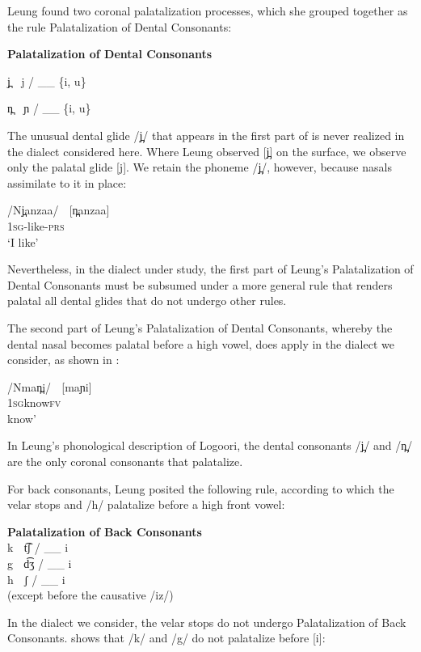 \documentclass[output=paper]{langsci/langscibook}
\begin{document}
Leung found two coronal palatalization processes, which she grouped together as the rule Palatalization of Dental Consonants:


\ea{}

\textbf{Palatalization of Dental Consonants} \citep[117]{Leung1991}




j̪  j / \_\_ \{i, u\}

n̪  ɲ / \_\_ \{i, u\}
\z


The unusual dental glide /j̪/ that appears in the first part of  is never realized in the dialect considered here. Where Leung observed [j̪] on the surface, we observe only the palatal glide [j]. We retain the phoneme /j̪/, however, because nasals assimilate to it in place:

\ea{}
 /Nj̪anzaa/    [n̪anzaa]  \\{}
\textsc{1sg}{}-like-\textsc{prs}\\{}
\glt ‘I like’
\z

Nevertheless, in the dialect under study, the first part of Leung’s Palatalization of Dental Consonants must be subsumed under a more general rule that renders palatal all dental glides that do not undergo other rules.

The second part of Leung’s Palatalization of Dental Consonants, whereby the dental nasal becomes palatal before a high vowel, does apply in the dialect we consider, as shown in :


\ea{}
 /Nman̪i/    [maɲi]   \\{} 
\textsc{1sg}know\textsc{fv}\\{}
 know’
\z

In Leung’s phonological description of Logoori, the dental consonants /j̪/ and /n̪/ are the only coronal consonants that palatalize.    

For back consonants, Leung posited the following rule, according to which the velar stops and /h/ palatalize before a high front vowel:


\ea{}
\textbf{Palatalization of Back Consonants} \citep[116]{Leung1991}\\{}
k  t͡ʃ / \_\_ i
\\{}
g  d͡ʒ / \_\_ i
\\{}
h  ʃ / \_\_ i      
\\{}
(except before the causative /iz/)
\z


In the dialect we consider, the velar stops do not undergo Palatalization of Back Consonants.  shows that /k/ and /g/ do not palatalize before [i]:
\end{document}
